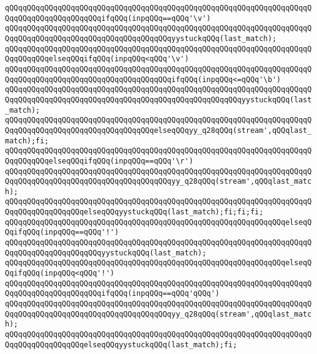 \verb|qQQqqQQqqQQqqQQqqQQqqQQqqQQqqQQqqQQqqQQqqQQqqQQqqQQqqQQqqQQqqQQqqQQqqQQqqQQqqQQqqQQqqQQqqQQqifqQQq(inpqQQq==qQQq'\v')|\newline
\verb|qQQqqQQqqQQqqQQqqQQqqQQqqQQqqQQqqQQqqQQqqQQqqQQqqQQqqQQqqQQqqQQqqQQqqQQqqQQqqQQqqQQqqQQqqQQqqQQqqQQqqQQqqQQqyystuckqQQq(last_match);|\newline
\verb|qQQqqQQqqQQqqQQqqQQqqQQqqQQqqQQqqQQqqQQqqQQqqQQqqQQqqQQqqQQqqQQqqQQqqQQqqQQqqQQqelseqQQqifqQQq(inpqQQq<qQQq'\v')|\newline
\verb|qQQqqQQqqQQqqQQqqQQqqQQqqQQqqQQqqQQqqQQqqQQqqQQqqQQqqQQqqQQqqQQqqQQqqQQqqQQqqQQqqQQqqQQqqQQqqQQqqQQqqQQqqQQqifqQQq(inpqQQq<=qQQq'\b')|\newline
\verb|qQQqqQQqqQQqqQQqqQQqqQQqqQQqqQQqqQQqqQQqqQQqqQQqqQQqqQQqqQQqqQQqqQQqqQQqqQQqqQQqqQQqqQQqqQQqqQQqqQQqqQQqqQQqqQQqqQQqqQQqqQQqyystuckqQQq(last_match);|\newline
\verb|qQQqqQQqqQQqqQQqqQQqqQQqqQQqqQQqqQQqqQQqqQQqqQQqqQQqqQQqqQQqqQQqqQQqqQQqqQQqqQQqqQQqqQQqqQQqqQQqqQQqqQQqelseqQQqyy_q28qQQq(stream',qQQqlast_match);fi;|\newline
\verb|qQQqqQQqqQQqqQQqqQQqqQQqqQQqqQQqqQQqqQQqqQQqqQQqqQQqqQQqqQQqqQQqqQQqqQQqqQQqqQQqelseqQQqifqQQq(inpqQQq==qQQq'\r')|\newline
\verb|qQQqqQQqqQQqqQQqqQQqqQQqqQQqqQQqqQQqqQQqqQQqqQQqqQQqqQQqqQQqqQQqqQQqqQQqqQQqqQQqqQQqqQQqqQQqqQQqqQQqqQQqqQQqyy_q28qQQq(stream',qQQqlast_match);|\newline
\verb|qQQqqQQqqQQqqQQqqQQqqQQqqQQqqQQqqQQqqQQqqQQqqQQqqQQqqQQqqQQqqQQqqQQqqQQqqQQqqQQqqQQqqQQqelseqQQqyystuckqQQq(last_match);fi;fi;fi;|\newline
\verb|qQQqqQQqqQQqqQQqqQQqqQQqqQQqqQQqqQQqqQQqqQQqqQQqqQQqqQQqqQQqqQQqelseqQQqifqQQq(inpqQQq==qQQq'!')|\newline
\verb|qQQqqQQqqQQqqQQqqQQqqQQqqQQqqQQqqQQqqQQqqQQqqQQqqQQqqQQqqQQqqQQqqQQqqQQqqQQqqQQqqQQqqQQqqQQqyystuckqQQq(last_match);|\newline
\verb|qQQqqQQqqQQqqQQqqQQqqQQqqQQqqQQqqQQqqQQqqQQqqQQqqQQqqQQqqQQqqQQqelseqQQqifqQQq(inpqQQq<qQQq'!')|\newline
\verb|qQQqqQQqqQQqqQQqqQQqqQQqqQQqqQQqqQQqqQQqqQQqqQQqqQQqqQQqqQQqqQQqqQQqqQQqqQQqqQQqqQQqqQQqqQQqifqQQq(inpqQQq==qQQq'qQQq')|\newline
\verb|qQQqqQQqqQQqqQQqqQQqqQQqqQQqqQQqqQQqqQQqqQQqqQQqqQQqqQQqqQQqqQQqqQQqqQQqqQQqqQQqqQQqqQQqqQQqqQQqqQQqqQQqqQQqyy_q28qQQq(stream',qQQqlast_match);|\newline
\verb|qQQqqQQqqQQqqQQqqQQqqQQqqQQqqQQqqQQqqQQqqQQqqQQqqQQqqQQqqQQqqQQqqQQqqQQqqQQqqQQqqQQqqQQqelseqQQqyystuckqQQq(last_match);fi;|\newline

